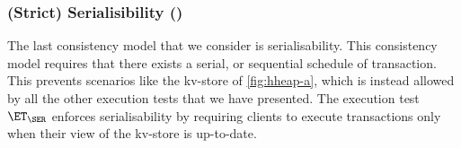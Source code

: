
\subsubsection{(Strict) Serialisibility (\SER)}
The last consistency model that we consider is serialisability. This consistency model 
requires that there exists a serial, or sequential schedule of transaction. 
This prevents scenarios like the kv-store of \cref{fig:hheap-a}, which is instead allowed 
by all the other execution tests that we have presented.
The execution test $\ET_{\SER}$ enforces serialisability by requiring clients to 
execute transactions only when their view of the kv-store is up-to-date.

